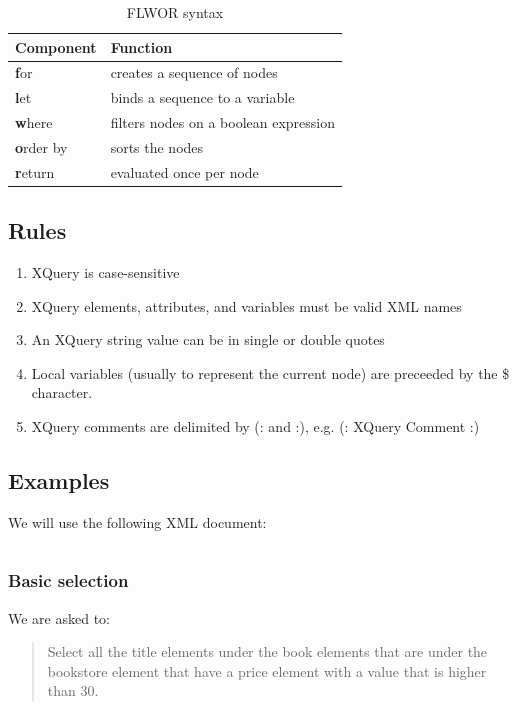 \documentclass{pgnotes}
\begin{document}
\begin{table}[htbp]
  \begin{tabularx}{1.0\linewidth}{l X}
    \toprule
    \textbf{Component} & \textbf{Function} \\
    \midrule
    \textbf{f}or & creates a sequence of nodes \\
    \textbf{l}et & binds a sequence to a variable \\
    \textbf{w}here & filters nodes on a boolean expression \\
    \textbf{o}rder by & sorts the nodes \\
    \textbf{r}eturn & evaluated once per node \\
    \bottomrule
  \end{tabularx}
  \caption{FLWOR syntax}
  \label{tab:flwor}
\end{table}


\subsection{Rules}

\begin{enumerate}
\item XQuery is case-sensitive
\item XQuery elements, attributes, and variables must be valid XML names
\item An XQuery string value can be in single or double quotes
\item Local variables (usually to represent the current node) are preceeded by the \$ character. 
\item XQuery comments are delimited by (: and :), e.g. (: XQuery Comment :)
\end{enumerate}


\subsection{Examples}

We will use the following XML document:

\inputminted{xml}{xpath_code/books.xml}


\subsubsection{Basic selection}

We are asked to:
\begin{quotation}
Select all the title elements under the book elements that are under the bookstore element that have a price element with a value that is higher than 30.
\end{quotation}
\end{document}
